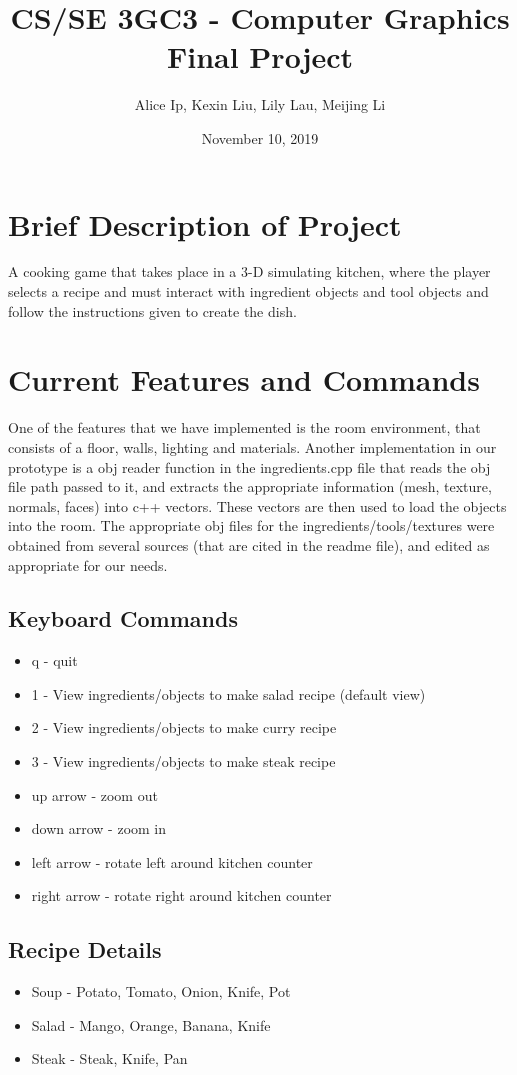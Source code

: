 \documentclass[11pt]{article}
\author{Alice Ip, Kexin Liu, Lily Lau, Meijing Li}
\date{November 10, 2019}
\title{CS/SE 3GC3 - Computer Graphics Final Project}
\begin{document}
\maketitle

\section*{Brief Description of Project}
\label{sec:org14152ec}
A cooking game that takes place in a 3-D simulating kitchen, where the player selects a recipe and must interact with ingredient objects and tool objects and follow the instructions given to create the dish.


\section*{Current Features and Commands}
\label{sec:orga6520a9}
One of the features that we have implemented is the room environment, that consists of a floor, walls, lighting and materials. Another implementation in our prototype is a obj reader function in the ingredients.cpp file that reads the obj file path passed to it, and extracts the appropriate information (mesh, texture, normals, faces) into c++ vectors. These vectors are then used to load the objects into the room. The appropriate obj files for the ingredients/tools/textures were obtained from several sources (that are cited in the readme file), and edited as appropriate for our needs. 

\subsection*{Keyboard Commands}
\label{sec:org454b11b}
\begin{itemize}
\item q - quit
\item 1 - View ingredients/objects to make salad recipe (default view)
\item 2 - View ingredients/objects to make curry recipe
\item 3 - View ingredients/objects to make steak recipe
\item up arrow - zoom out
\item down arrow - zoom in
\item left arrow - rotate left around kitchen counter
\item right arrow - rotate right around kitchen counter
\end{itemize}

\subsection*{Recipe Details}
\label{sec:org9f96562}
\begin{itemize}
\item Soup - Potato, Tomato, Onion, Knife, Pot
\item Salad - Mango, Orange, Banana, Knife
\item Steak - Steak, Knife, Pan
\end{itemize}
\end{document}
